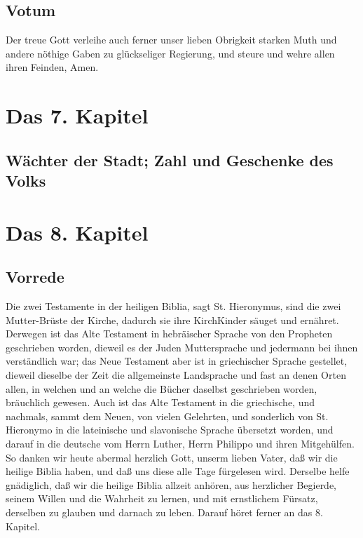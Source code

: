 \section{Votum}

Der treue Gott verleihe auch ferner unser lieben Obrigkeit starken Muth und andere nöthige Gaben zu glückseliger Regierung, und steure und wehre allen ihren Feinden, Amen.

\chapter{Das 7. Kapitel}

\section{Wächter der Stadt; Zahl und Geschenke des Volks}



\chapter{Das 8. Kapitel}

\section{Vorrede}

Die zwei Testamente in der heiligen Biblia, sagt St. Hieronymus, sind die zwei Mutter-Brüste der Kirche, dadurch sie ihre KirchKinder säuget und ernähret. Derwegen ist das Alte Testament in hebräischer Sprache von den Propheten geschrieben worden, dieweil es der Juden Muttersprache und jedermann bei ihnen verständlich war; das Neue Testament aber ist in griechischer Sprache gestellet, dieweil dieselbe der Zeit die allgemeinste Landsprache und fast an denen Orten allen, in welchen und an welche die Bücher daselbst geschrieben worden, bräuchlich gewesen. Auch ist das Alte Testament in die griechische, und nachmals, sammt dem Neuen, von vielen Gelehrten, und sonderlich von St. Hieronymo in die lateinische und slavonische Sprache übersetzt worden, und darauf in die deutsche vom Herrn Luther, Herrn Philippo und ihren Mitgehülfen. So danken wir heute abermal herzlich Gott, unserm lieben Vater, daß wir die heilige Biblia haben, und daß uns diese alle Tage fürgelesen wird. Derselbe helfe gnädiglich, daß wir die heilige Biblia allzeit anhören, aus herzlicher Begierde, seinem Willen und die Wahrheit zu lernen, und mit ernstlichem Fürsatz, derselben zu glauben und darnach zu leben. Darauf höret ferner an das 8. Kapitel.

